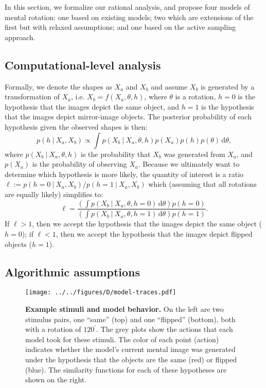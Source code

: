 \documentclass[10pt,letterpaper]{article}
\newcommand{\hi}[0]{h=0}
\newcommand{\hf}[0]{h=1}
\newcommand{\dif}[0]{\,\mathrm{d}}
\begin{document}
In this section, we formalize our rational analysis, and propose four
models of mental rotation: one based on existing models; two which are
extensions of the first but with relaxed assumptions; and one based on
the active sampling approach.

\subsection{Computational-level analysis}

Formally, we denote the shapes as $X_a$ and $X_b$ and assume $X_b$ is
generated by a transformation of $X_a$, i.e. $X_b=f(X_a, \theta, h)$,
where $\theta$ is a rotation, $\hi$ is the hypothesis that the images
depict the same object, and $\hf$ is the hypothesis that the images
depict mirror-image objects. The posterior probability of each
hypothesis given the observed shapes is then:
\begin{equation}
  p(h\ \vert\ X_a, X_b) \propto \int p(X_b\ \vert\ X_a, \theta, h)p(X_a)p(h)p(\theta)\dif\theta,
  \label{eq:posterior}
\end{equation}
where $p(X_b\ \vert\ X_a, \theta, h)$ is the probability that $X_b$
was generated from $X_a$, and $p(X_a)$ is the probability of observing
$X_a$. Because we ultimately want to determine which hypothesis is
more likely, the quantity of interest is a ratio $\ell:=p(\hi\ \vert\
X_a, X_b) / p(\hf\ \vert\ X_a, X_b)$ which (assuming that all
rotations are equally likely) simplifies to:
\begin{equation}
  \ell = \frac{\left(\int p(X_b\ \vert\ X_a, \theta, \hi)\dif\theta\right)p(\hi)}{\left(\int p(X_b\ \vert\ X_a, \theta, \hf)\dif\theta\right)p(\hf)}.
  \label{eq:lh-ratio}
\end{equation}
If $\ell > 1$, then we accept the hypothesis that the images depict
the same object ($\hi$); if $\ell < 1$, then we accept the hypothesis
that the images depict flipped objects ($\hf$).

\subsection{Algorithmic assumptions}

\begin{figure*}[t]
  \begin{center}
    \texttt{[image: ../../figures/D/model-traces.pdf]}
    \caption{\textbf{Example stimuli and model behavior.} On the left
      are two stimulus pairs, one ``same'' (top) and one ``flipped''
      (bottom), both with a rotation of $120^\prime$. The grey plots
      show the actions that each model took for these stimuli. The
      color of each point (action) indicates whether the model's
      current mental image was generated under the hypothesis that the
      objects are the same (red) or flipped (blue). The similarity
      functions for each of these hypotheses are shown on the right.}
    \label{fig:model-traces}
  \end{center}
\end{figure*}
\end{document}
